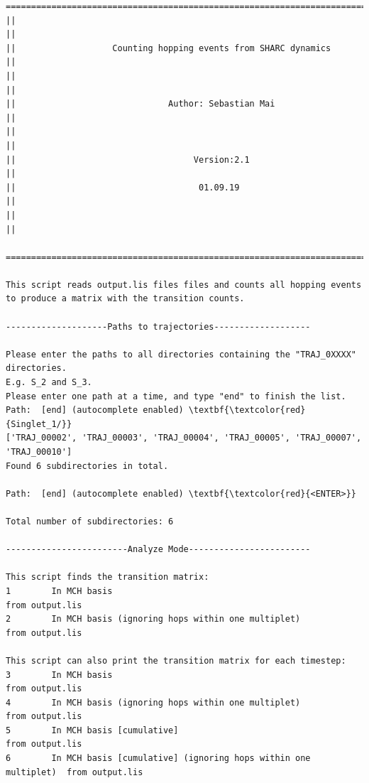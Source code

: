 \documentclass[a4paper,11pt,DIV=15,openany]{scrbook}
\begin{document}
\begin{oframed}
\footnotesize\begin{Verbatim}[commandchars=\\\{\}]
  ================================================================================
||                                                                                ||
||                   Counting hopping events from SHARC dynamics                  ||
||                                                                                ||
||                              Author: Sebastian Mai                             ||
||                                                                                ||
||                                   Version:2.1                                  ||
||                                    01.09.19                                    ||
||                                                                                ||
  ================================================================================

This script reads output.lis files files and counts all hopping events
to produce a matrix with the transition counts.
  
--------------------Paths to trajectories-------------------

Please enter the paths to all directories containing the "TRAJ_0XXXX" directories.
E.g. S_2 and S_3. 
Please enter one path at a time, and type "end" to finish the list.
Path:  [end] (autocomplete enabled) \textbf{\textcolor{red}{Singlet_1/}}
['TRAJ_00002', 'TRAJ_00003', 'TRAJ_00004', 'TRAJ_00005', 'TRAJ_00007', 'TRAJ_00010']
Found 6 subdirectories in total.

Path:  [end] (autocomplete enabled) \textbf{\textcolor{red}{<ENTER>}}

Total number of subdirectories: 6

------------------------Analyze Mode------------------------

This script finds the transition matrix:
1        In MCH basis                                                    from output.lis
2        In MCH basis (ignoring hops within one multiplet)               from output.lis

This script can also print the transition matrix for each timestep:
3        In MCH basis                                                    from output.lis
4        In MCH basis (ignoring hops within one multiplet)               from output.lis
5        In MCH basis [cumulative]                                       from output.lis
6        In MCH basis [cumulative] (ignoring hops within one multiplet)  from output.lis


\end{Verbatim}
\end{oframed}
\end{document}
